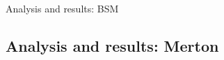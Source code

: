 \documentclass{beamer}
\begin{document}
\begin{frame}{Analysis and results: BSM}
\begin{figure}[h]
  \centering
  
\end{figure}
\end{frame}













\subsection{Analysis and results: Merton}
\end{document}
